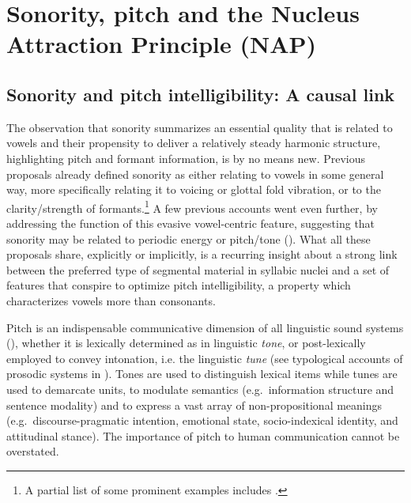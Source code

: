 \chapter{Sonority, pitch and the Nucleus Attraction Principle (NAP)}\label{sec:sonPitch}

\section{Sonority and pitch intelligibility: A causal link}\label{sec:pitchintelligibility}

The observation that sonority summarizes an essential quality that is related to vowels and their propensity to deliver a relatively steady harmonic structure, highlighting pitch and formant information, is by no means new. Previous proposals already defined sonority as either relating to vowels in some general way, more specifically relating it to voicing or glottal fold vibration, or to the clarity/strength of formants.\footnote{A partial list of some prominent examples includes \citet{sigurd1955rank, jakobson1956fundamentals, chomsky1968spesk, foley1972rule, ladefoged1971preliminaries, allen1973accentsk, fujimura1975syllable, Donegan1978onthenatural, ultan1978typological, price1980sonority, lindblom1983production, anderson1986suprasegmental, vennemann1988preferencesk, levitt1991syllable, pierrehumbert1992lenition, fujimura1997acoustic, stemberger1997handbook, boersma1998functional, zhang2001effects, howe2004harmonic, clements2009does, sharma2018significance}.} A few previous accounts went even further, by addressing the function of this evasive vowel-centric feature, suggesting that sonority may be related to periodic energy or pitch/tone (\citealt{heselwood1998unusual, ladefoged1997linguistic, lass1988phonology, nathan1989preliminaries, puppel1992sonority}). What all these proposals share, explicitly or implicitly, is a recurring insight about a strong link between the preferred type of segmental material in syllabic nuclei and a set of features that conspire to optimize pitch intelligibility, a property which characterizes vowels more than consonants.

Pitch is an indispensable communicative dimension of all linguistic sound systems (\citealt{bolinger1978intonation, cutler1997prosody, house1990tonal, roettger2019tune}), whether it is lexically determined as in linguistic \emph{tone},
or post-lexically employed to convey intonation, i.e. the linguistic \emph{tune} (see typological accounts of prosodic systems in \citealt{jun2005prosodicsk, jun2015prosodicsk}).
Tones are used to distinguish lexical items while tunes are used to demarcate units,
to modulate semantics (e.g.~information structure and sentence modality) and to
express a vast array of non-propositional meanings (e.g.~discourse-pragmatic intention, emotional state, socio-indexical identity, and attitudinal stance). The importance of pitch to human communication cannot be overstated.


